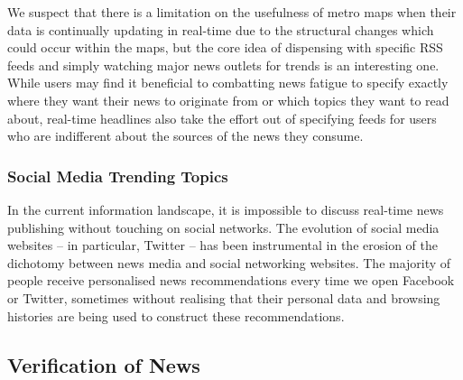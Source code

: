 We suspect that there is a limitation on the usefulness of metro maps when their data is continually updating in real-time due to the structural changes which could occur within the maps, but the core idea of dispensing with specific RSS feeds and simply watching major news outlets for trends is an interesting one. While users may find it beneficial to combatting news fatigue to specify exactly where they want their news to originate from or which topics they want to read about, real-time headlines also take the effort out of specifying feeds for users who are indifferent about the sources of the news they consume.


\subsubsection{Social Media Trending Topics}

In the current information landscape, it is impossible to discuss real-time news publishing without touching on social networks. The evolution of social media websites -- in particular, Twitter -- has been instrumental in the erosion of the dichotomy between news media and social networking websites. The majority of people receive personalised news recommendations every time we open Facebook or Twitter, sometimes without realising that their personal data and browsing histories are being used to construct these recommendations.




\subsection{Verification of News}



